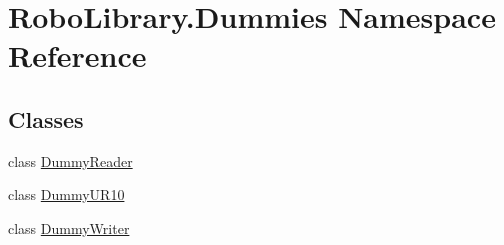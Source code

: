 \hypertarget{namespace_robo_library_1_1_dummies}{}\section{Robo\+Library.\+Dummies Namespace Reference}
\label{namespace_robo_library_1_1_dummies}
\subsection*{Classes}
\begin{DoxyCompactItemize}
\item 
class \hyperlink{class_robo_library_1_1_dummies_1_1_dummy_reader}{Dummy\+Reader}
\item 
class \hyperlink{class_robo_library_1_1_dummies_1_1_dummy_u_r10}{Dummy\+U\+R10}
\item 
class \hyperlink{class_robo_library_1_1_dummies_1_1_dummy_writer}{Dummy\+Writer}
\end{DoxyCompactItemize}
